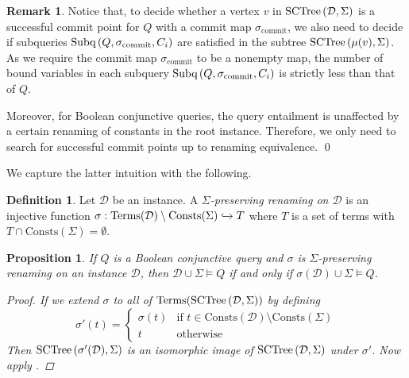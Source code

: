 \documentclass[12pt]{report}
\theoremstyle{plain}
\newtheorem{proposition}[theorem]{Proposition}
\theoremstyle{definition}
\newtheorem{definition}[theorem]{Definition}
\newtheorem{remark}[theorem]{Remark}
\def\Consts{{\mathrm{Consts}}}
\def\Terms{{\mathrm{Terms}}}
\newcommand{\SCTree}[2]{\ensuremath{\normalfont{\textrm{SCTree}} \left( #1, #2 \right)}}
\newcommand{\Subq}[3]{\ensuremath{\normalfont{\textrm{Subq}} \left( #1, #2, #3 \right)}}
\begin{document}
\begin{remark}
\label{remark-towards-query-answering-procedure}
  Notice that, to decide whether a vertex $v$ in $\SCTree{\mathcal{D}}{\Sigma}$ is a successful commit point for $Q$ with a commit map $\sigma_\mathrm{commit}$, we also need to decide if subqueries $\Subq{Q}{\sigma_\mathrm{commit}}{C_i}$ are satisfied in the subtree $\SCTree{\mu(v)}{\Sigma}$. As we require the commit map $\sigma_\mathrm{commit}$ to be a nonempty map, the number of bound variables in each subquery $\Subq{Q}{\sigma_\mathrm{commit}}{C_i}$ is strictly less than that of $Q$.

  Moreover, for Boolean conjunctive queries, the query entailment is unaffected by a certain renaming of constants in the root instance. Therefore, we only need to search for successful commit points up to renaming equivalence.
  \qed
\end{remark}

We capture the latter intuition with the following.

\begin{definition}
  Let $\mathcal{D}$ be an instance. A \emph{$\Sigma$-preserving renaming on $\mathcal{D}$} is an injective function $\sigma: \Terms(\mathcal{D}) \setminus \Consts(\Sigma) \xhookrightarrow{} T$ where $T$ is a set of terms with $T \cap \Consts(\Sigma) = \emptyset$.
\end{definition}

\begin{proposition}
\label{bcq-invariant-under-sigma-preserving-renaming}
  If $Q$ is a Boolean conjunctive query and $\sigma$ is $\Sigma$-preserving renaming on an instance $\mathcal{D}$, then $\mathcal{D} \cup \Sigma \models Q$ if and only if $\sigma(\mathcal{D}) \cup \Sigma \models Q$.
  \begin{proof}
    If we extend $\sigma$ to all of $\Terms(\SCTree{\mathcal{D}}{\Sigma})$ by defining $$\sigma'(t) =
    \begin{cases}
      \sigma(t) & \text{if } t \in \Consts(\mathcal{D}) \setminus \Consts(\Sigma) \\
      t & \text{otherwise}
    \end{cases}$$
    Then $\SCTree{\sigma'(\mathcal{D})}{\Sigma}$ is an isomorphic image of $\SCTree{\mathcal{D}}{\Sigma}$ under $\sigma'$. Now apply .
  \end{proof}
\end{proposition}
\end{document}
